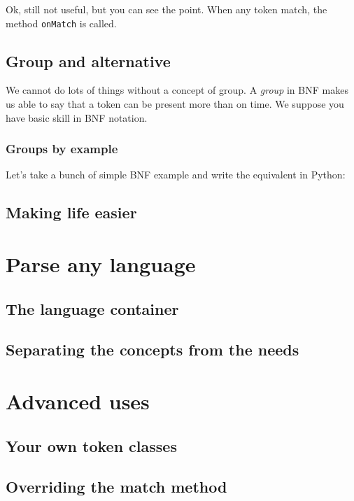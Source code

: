 \documentclass[a4paper]{article}
\begin{document}
                Ok, still not useful, but you can see the point. When any token match,
                the method \texttt{onMatch} is called.

        \subsection{Group and alternative}
            We cannot do lots of things without a concept of group. A \textit{group} in BNF
            makes us able to say that a token can be present more than on time. We suppose
            you have basic skill in BNF notation.

            \subsubsection{Groups by example}
                Let's take a bunch of simple BNF example and write the equivalent in Python:
                



        \subsection{Making life easier}

    \newpage
    \section{Parse any language}
        \subsection{The language container}
        \subsection{Separating the concepts from the needs}
        \subsection{}

    \newpage
    \section{Advanced uses}
        \subsection{Your own token classes}
        \subsection{Overriding the match method}
        \subsection{}
\end{document}
